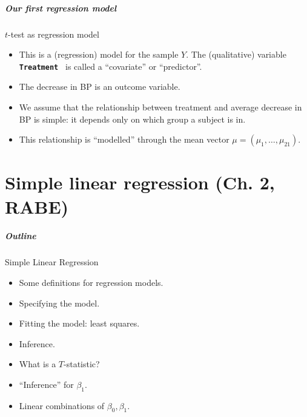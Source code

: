 \documentclass[handout]{beamer}
\newcommand{\Rscode}[1]{{\small \bf \tt #1 }}
\begin{document}
   \begin{frame} \frametitle{Our first regression model}

   \begin{block}
    {$t$-test as regression model}
   \begin{itemize}
   \item This is a (regression) model for the sample $Y$. The
   (qualitative) variable \Rscode{Treatment} is
   called a ``covariate'' or ``predictor''.
   \item The decrease in BP is an outcome variable.
   \item We assume that the relationship between treatment and average
   decrease in BP is simple: it depends only on which group a subject is in.
   \item This relationship is ``modelled'' through the mean
   vector $\mu=(\mu_1, \dots, \mu_{21})$.
   \end{itemize}
   \end{block}
   \end{frame}

   \part{Simple linear regression (Ch. 2, RABE)}
   \frame{\partpage}


   \begin{frame} \frametitle{Outline}

   \begin{block}
   {Simple Linear Regression}
   \begin{itemize}
   \item Some definitions for regression models.
   \item Specifying the model.
   \item Fitting the model: least squares.
   \item Inference.

   \item What is a $T$-statistic?

   \item ``Inference'' for $\beta_1$.

   \item Linear combinations of $\beta_0, \beta_1$.

   \end{itemize}
   \end{block}
   \vfill
   \end{frame}
\end{document}

